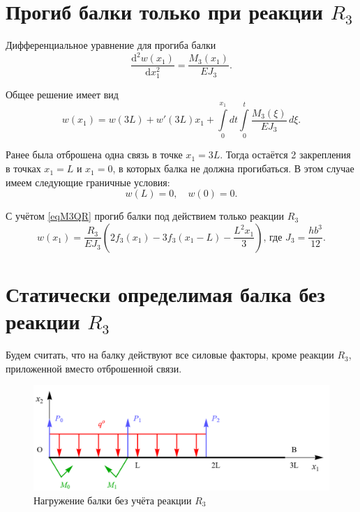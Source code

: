 \documentclass[12pt, a4paper]{article}
\begin{document}
	\section{Прогиб балки только при реакции $R_3$} 
	
	Дифференциальное уравнение для прогиба балки
	\[
	\dfrac{\mathrm{d}^2 w(x_1)}{\mathrm{d} x_1^2} = \dfrac{M_3(x_1)}{E J_3}.
	\]
	
	Общее решение имеет вид
	\vspace{-0.5em}
	\begin{equation}
		w(x_1) = w(3L) + w'(3L) x_1 + \int\limits_0^{x_1} \! dt \int\limits_0^t \dfrac{M_3(\xi)}{E J_3} \, d \xi.
		\label{eqw}
	\end{equation}
	
	Ранее была отброшена одна связь в точке $x_1 = 3L$. Тогда остаётся 2 закрепления в точках $x_1 = L$ и $x_1 = 0$, в которых балка не должна прогибаться. В этом случае имеем следующие граничные условия:
	\vspace{-0.5em}
	\begin{equation}
		w(L) = 0, \quad w(0) = 0.
		\label{eqwGU}
	\end{equation}
	
	\vspace{-0.5em}
	
	С учётом \eqref{eqM3QR} прогиб балки под действием только реакции $R_3$
	\begin{equation}
		w(x_1) = \dfrac{R_3}{E J_3} \left( 2 f_3(x_1) - 3 f_3(x_1 - L) - \dfrac{L^2 x_1}{3} \right) \text{, где } J_3 = \frac{h b^3}{12}.
		\label{eqwR3}
	\end{equation}
	
	\newpage
	
	\section{Статически определимая балка без реакции $R_3$} 
	
	Будем считать, что на балку действуют все силовые факторы, кроме реакции $R_3$, приложенной вместо отброшенной связи.
	
	\begin{figure}[!h]
		\centering
		\includegraphics[width=0.75\linewidth]{plot-7}
		\caption{Нагружение балки без учёта реакции $R_3$}
	\end{figure}
	
\end{document}

